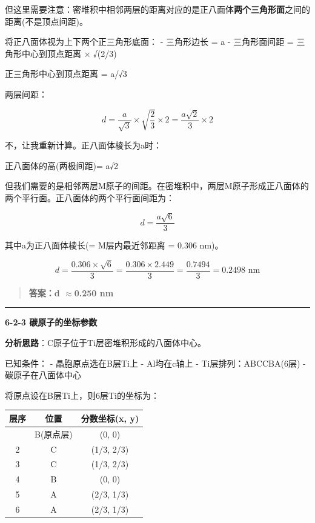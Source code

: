 \documentclass[a4paper,11pt]{ctexart}
\newcounter{none}
\newcommand{\箭}{\ensuremath{\rightarrow}}
\newcommand{\左箭}{\ensuremath{\leftarrow}}
\newcommand{\上箭}{\ensuremath{\uparrow}}
\newcommand{\下箭}{\ensuremath{\downarrow}}
\newcommand{\衡}{\ensuremath{\rightleftharpoons}}
\newcommand{\双箭}{\ensuremath{\leftrightarrow}}
\newcommand{\约等于}{\ensuremath{\approx}}
\newcommand{\小于等于}{\ensuremath{\leq}}
\newcommand{\大于等于}{\ensuremath{\geq}}
\newcommand{\不等于}{\ensuremath{\neq}}
\newcommand{\西格马}{\ensuremath{\sigma}}
\newcommand{\派}{\ensuremath{\pi}}
\begin{document}
但这里需要注意：密堆积中相邻两层的距离对应的是正八面体\textbf{两个三角形面}之间的距离(不是顶点间距)。

将正八面体视为上下两个正三角形底面：
- 三角形边长 = a
- 三角形面间距 = 三角形中心到顶点距离 × √(2/3)

正三角形中心到顶点距离 = a/√3

两层间距：

\[d = \frac{a}{\sqrt{3}} \times \sqrt{\frac{2}{3}} \times 2 = \frac{a\sqrt{2}}{3} \times 2\]

不，让我重新计算。正八面体棱长为a时：

正八面体的高(两极间距)= a√2

但我们需要的是相邻两层M原子的间距。在密堆积中，两层M原子形成正八面体的两个平行面。正八面体的两个平行面间距为：

\[d = \frac{a\sqrt{6}}{3}\]

其中a为正八面体棱长(= M层内最近邻距离 = 0.306 nm)。

\[d = \frac{0.306 \times \sqrt{6}}{3} = \frac{0.306 \times 2.449}{3} = \frac{0.7494}{3} = 0.2498 \text{ nm}\]

\begin{quote}
\textbf{答案：d \约等于 0.250 nm}
\end{quote}

\begin{center}\rule{0.5\linewidth}{0.5pt}\end{center}

\textbf{6-2-3 碳原子的坐标参数}

\textbf{分析思路}：C原子位于Ti层密堆积形成的八面体中心。

已知条件：
- 晶胞原点选在B层Ti上
- Al均在c轴上
- Ti层排列：ABCCBA(6层)
- 碳原子在八面体中心

将原点设在B层Ti上，则6层Ti的坐标为：

{\def\LTcaptype{none} %
\begin{longtable}[]{@{}ccc@{}}
\toprule\noalign{}
层序 & 位置 & 分数坐标(x, y) \\
\midrule\noalign{}
\endhead
\bottomrule\noalign{}
\endlastfoot
1 & B(原点层) & (0, 0) \\
2 & C & (1/3, 2/3) \\
3 & C & (1/3, 2/3) \\
4 & B & (0, 0) \\
5 & A & (2/3, 1/3) \\
6 & A & (2/3, 1/3) \\
\end{longtable}
}
\end{document}
